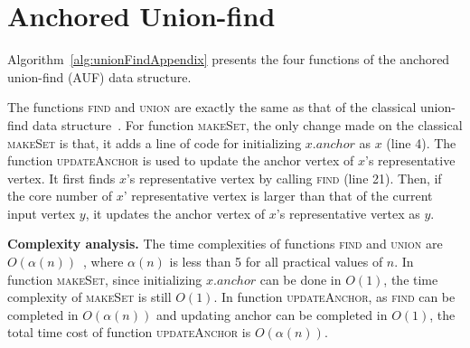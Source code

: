 \section{Anchored Union-find}
\label{app:auf}

Algorithm~\ref{alg:unionFindAppendix} presents
the four functions of the anchored union-find (AUF) data structure.

The functions \textsc{find} and \textsc{union} are exactly the same
as that of the classical union-find data structure~\cite{unionFind}.
For function \textsc{makeSet}, the only change made on the classical \textsc{makeSet}
is that, it adds a line of code for initializing $x.anchor$ as $x$ (line 4).
The function \textsc{updateAnchor} is used to update the anchor vertex of $x$'s representative vertex.
It first finds $x$'s representative vertex by calling \textsc{find} (line 21).
Then, if the core number of $x$' representative vertex is larger than that of the current input vertex $y$,
it updates the anchor vertex of $x$'s representative vertex as $y$.

\textbf{Complexity analysis.}
The time complexities of functions \textsc{find} and \textsc{union} are $O(\alpha(n))$~\cite{unionFind},
where $\alpha(n)$ is less than 5 for all practical values of $n$.
In function \textsc{makeSet}, since initializing $x.anchor$ can be done in $O(1)$,
the time complexity of \textsc{makeSet} is still $O(1)$.
In function \textsc{updateAnchor}, as \textsc{find} can be completed in $O(\alpha(n))$
and updating anchor can be completed in $O(1)$,
the total time cost of function \textsc{updateAnchor} is $O(\alpha(n))$. 